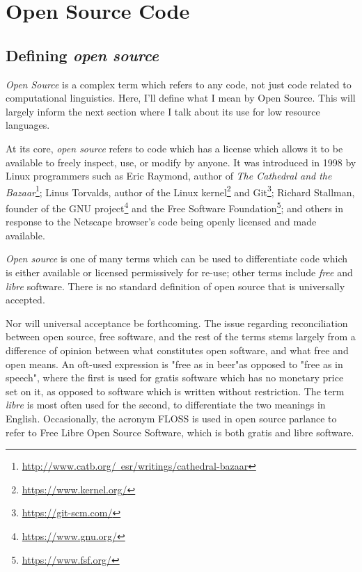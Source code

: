 \section{Open Source Code}
\label{sec:open-source}


\subsection{Defining {\it open source}}
\label{subsec:defining-open-source}

{\it Open Source} is a complex term which refers to any code, not just code related to computational linguistics. Here, I'll define what I mean by Open Source. This will largely inform the next section where I talk about its use for low resource languages.

At its core, {\it open source} refers to code which has a license which allows it to be available to freely inspect, use, or modify by anyone. It was introduced in 1998 by Linux programmers such as Eric Raymond, author of {\it The Cathedral and the Bazaar}\footnote{\href{http://www.catb.org/~esr/writings/cathedral-bazaar}{http://www.catb.org/~esr/writings/cathedral-bazaar}}\citep{raymond1999cathedral}; Linus Torvalds, author of the Linux kernel\footnote{\href{https://www.kernel.org/}{https://www.kernel.org/}} and Git\footnote{\href{https://git-scm.com/}{https://git-scm.com/}}; Richard Stallman, founder of the GNU project\footnote{\href{https://www.gnu.org/}{https://www.gnu.org/}} and the Free Software Foundation\footnote{\href{https://www.fsf.org/}{https://www.fsf.org/}}; and others in response to the Netscape browser's code being openly licensed and made available.

{\it Open source} is one of many terms which can be used to differentiate code which is either available or licensed permissively for re-use; other terms include {\it free} and {\it libre} software. There is no standard definition of open source that is universally accepted.

Nor will universal acceptance be forthcoming. The issue regarding reconciliation between open source, free software, and the rest of the terms stems largely from a difference of opinion between what constitutes open software, and what free and open means. An oft-used expression is "free as in beer"as opposed to "free as in speech", where the first is used for gratis software which has no monetary price set on it, as opposed to software which is written without restriction. The term {\it libre} is most often used for the second, to differentiate the two meanings in English. Occasionally, the acronym FLOSS is used in open source parlance to refer to Free Libre Open Source Software, which is both gratis and libre software.

